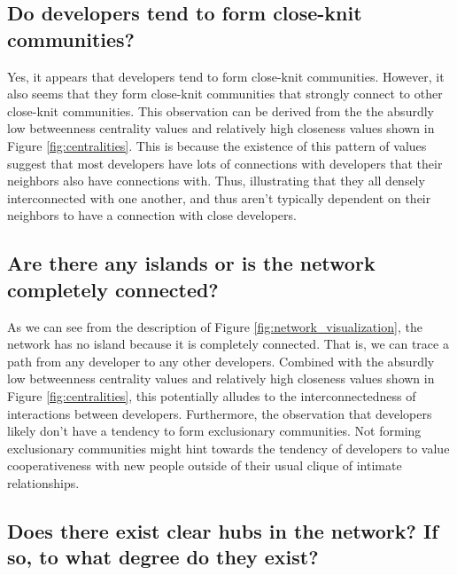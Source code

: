 \documentclass[9pt,twocolumn,twoside]{pnas-new}
\begin{document}
\subsection*{Do developers tend to form close-knit communities?}

Yes, it appears that developers tend to form close-knit communities. However, it also seems that they form close-knit communities that strongly connect to other close-knit communities. This observation can be derived from the the absurdly low betweenness centrality values and relatively high closeness values shown in Figure \ref{fig:centralities}. This is because the existence of this pattern of values suggest that most developers have lots of connections with developers that their neighbors also have connections with. Thus, illustrating that they all densely interconnected with one another, and thus aren't typically dependent on their neighbors to have a connection with close developers.

\subsection*{Are there any islands or is the network completely connected?}

As we can see from the description of Figure \ref{fig:network_visualization}, the network has no island because it is completely connected. That is, we can trace a path from any developer to any other developers. Combined with the absurdly low betweenness centrality values and relatively high closeness values shown in Figure \ref{fig:centralities}, this potentially alludes to the interconnectedness of interactions between developers. Furthermore, the observation that developers likely don't have a tendency to form exclusionary communities. Not forming exclusionary communities might hint towards the tendency of developers to value cooperativeness with new people outside of their usual clique of intimate relationships.

\subsection*{Does there exist clear hubs in the network? If so, to what degree do they exist?}
\end{document}
